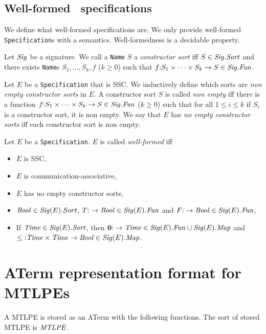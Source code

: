 \documentclass[twoside,fleqn,a4paper,dvips]{article}
\newcommand{\Sig}{\nm{Sig}}
\newcommand{\Fun}{\nm{Fun}}
\newcommand{\nul}{{\bf 0}}
\begin{document}
\subsection{Well-formed \mcrl\ specifications}
We define what well-formed specifications are. We only provide
well-formed {\tt Specification}s with a semantics. Well-formedness
is a decidable property.
\begin{defn}
Let $\Sig$ be a signature. We call a {\tt Name} $S$ a {\it constructor sort}
iff $S\in\Sig.\Sort$ and there exists {\tt Name}s $S_1,\ldots, S_k, f$ ($k\geq 0$)
such that $f\ap S_1\times \cdots\times S_k\rightarrow S\in \Sig.\Fun$.
\end{defn}
\begin{defn}
Let $E$ be a {\tt Specification} that is SSC. 
We inductively define which sorts are {\it non empty constructor sorts} in $E$.
A constructor sort $S$ is called {\it non empty} iff there is a function
$f\ap S_1\times\cdots\times S_k\rightarrow S\in \Sig.\Fun$ ($k\geq 0$) such
that for all $1\leq i\leq k$ if $S_i$ is a constructor sort, it is non empty.
We say
that $E$ has {\em no empty constructor sorts} iff each constructor sort is non
empty.
\end{defn}
\begin{defn}
Let $E$ be a {\tt Specification}. $E$ is called {\it well-formed} iff 
\begin{itemize}
\item
$E$ is SSC, 
\item
$E$ is communication-associative,
\item
$E$ has no empty constructor sorts,
\item
$\Bool\in \Sig(E).Sort$, $T\ap \rightarrow\Bool\in \Sig(E).\Fun$ and
$F\ap \rightarrow\Bool\in \Sig(E).\Fun$,
\item
If $\Time\in\Sig(E).\Sort$, then $\nul\ap \rightarrow\Time\in \Sig(E).\Fun\cup
\Sig(E).\Map$ and $\leq\ap \Time\times\Time\rightarrow\Bool\in
\Sig(E).\Map$. 
\end{itemize}
\end{defn}

\newpage
\section{ATerm representation format for MTLPEs}
A MTLPE is stored as an ATerm with the following functions. The sort
of stored MTLPE is $\mathit{MTLPE}$.
\end{document}
